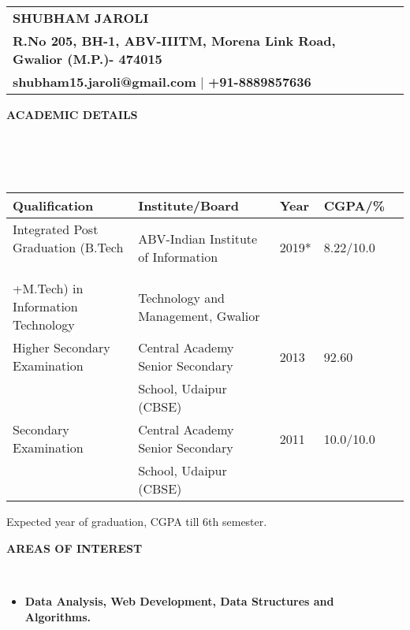\documentclass[a4paper,10pt]{article}
\newcommand{\lsep}{-0.5cm}
\newcommand{\resheading}[1]{{\small \colorbox{mygrey}{\begin{minipage}{0.975\textwidth}{\textbf{#1 \vphantom{p\^{E}}}}\end{minipage}}}}
\begin{document}

\begin{tabular*}{\textwidth}{l@{\extracolsep{\fill}}r}
\textbf{\Large SHUBHAM JAROLI} \\
\textbf{R.No 205, BH-1,
ABV-IIITM, Morena Link Road, 
Gwalior (M.P.)- 474015}\\
\textbf{shubham15.jaroli@gmail.com} |
\textbf{+91-8889857636} \\
\end{tabular*}

\resheading{\textbf{ACADEMIC DETAILS} }\\[\lsep]
\\ \\
\indent \begin{tabular}{ l @{\hskip 0.30in} l @{\hskip 0.30in} l @{\hskip 0.30in} l @{\hskip 0.35in} l }
\hline
\textbf{Qualification} & \textbf{Institute/Board} & \textbf{Year} & \textbf{CGPA/\%} \\
\hline
Integrated Post Graduation (B.Tech  \,\, & ABV-Indian Institute of Information & 2019* & 8.22/10.0 \\
+M.Tech) in Information Technology & Technology and Management, Gwalior \\
Higher Secondary Examination & Central Academy Senior Secondary & 2013 & 92.60\\
& School, Udaipur (CBSE) &  \\
Secondary Examination & Central Academy Senior Secondary & 2011 & 10.0/10.0\\
& School, Udaipur (CBSE) &  \\
\hline
\end{tabular}
\indent *Expected year of graduation, CGPA till 6th semester.
\\ 

\resheading{\textbf{AREAS OF INTEREST} }\\[\lsep]
\begin{itemize}
\item \indent \textbf{Data Analysis, Web Development, Data Structures and Algorithms.}
\end{itemize}
\end{document}
